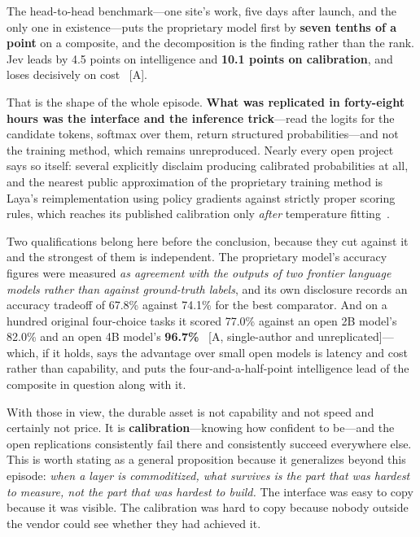 The head-to-head benchmark---one site's work, five days after launch, and the only one in existence---puts the proprietary model first by \textbf{seven tenths of a point} on a composite, and the decomposition is the finding rather than the rank. Jev leads by 4.5 points on intelligence and \textbf{10.1 points on calibration}, and loses decisively on cost~\cite{jevbench} [A].

That is the shape of the whole episode. \textbf{What was replicated in forty-eight hours was the interface and the inference trick}---read the logits for the candidate tokens, softmax over them, return structured probabilities---and not the training method, which remains unreproduced. Nearly every open project says so itself: several explicitly disclaim producing calibrated probabilities at all, and the nearest public approximation of the proprietary training method is Laya's reimplementation using policy gradients against strictly proper scoring rules, which reaches its published calibration only \emph{after} temperature fitting~\cite{jev-replications,laya}.

Two qualifications belong here before the conclusion, because they cut against it and the strongest of them is independent. The proprietary model's accuracy figures were measured \emph{as agreement with the outputs of two frontier language models rather than against ground-truth labels}, and its own disclosure records an accuracy tradeoff of 67.8\% against 74.1\% for the best comparator. And on a hundred original four-choice tasks it scored 77.0\% against an open 2B model's 82.0\% and an open 4B model's \textbf{96.7\%}~\cite{jev-accuracy-caveats} [A, single-author and unreplicated]---which, if it holds, says the advantage over small open models is latency and cost rather than capability, and puts the four-and-a-half-point intelligence lead of the composite in question along with it.

With those in view, the durable asset is not capability and not speed and certainly not price. It is \textbf{calibration}---knowing how confident to be---and the open replications consistently fail there and consistently succeed everywhere else. This is worth stating as a general proposition because it generalizes beyond this episode: \emph{when a layer is commoditized, what survives is the part that was hardest to measure, not the part that was hardest to build.} The interface was easy to copy because it was visible. The calibration was hard to copy because nobody outside the vendor could see whether they had achieved it.

